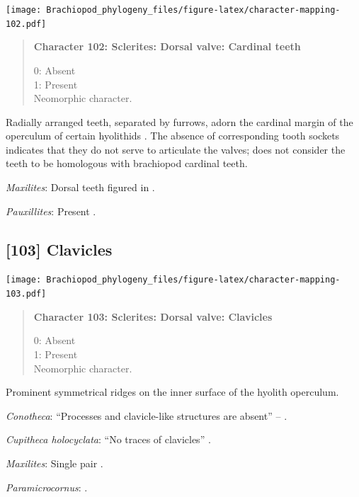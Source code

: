 \documentclass[openany]{book}
\begin{document}
\texttt{[image: Brachiopod\_phylogeny\_files/figure-latex/character-mapping-102.pdf]}

\begin{quote}
\textbf{Character 102: Sclerites: Dorsal valve: Cardinal teeth}

0: Absent\\
1: Present\\
Neomorphic character.
\end{quote}

Radially arranged teeth, separated by furrows, adorn the cardinal margin
of the operculum of certain hyolithids \citep{Marek1963}. The absence of
corresponding tooth sockets indicates that they do not serve to
articulate the valves; \citet{Marek1967} does not consider the teeth to
be homologous with brachiopod cardinal teeth.

\hypertarget{Maxilites-coding-102}{}
\emph{Maxilites}: Dorsal teeth figured in \citet{MartiMus2005}.

\hypertarget{Pauxillites-coding-102}{}
\emph{Pauxillites}: Present \citep{Marek1966}.

\subsection*{{[}103{]} Clavicles}\label{clavicles}

\texttt{[image: Brachiopod\_phylogeny\_files/figure-latex/character-mapping-103.pdf]}

\begin{quote}
\textbf{Character 103: Sclerites: Dorsal valve: Clavicles}

0: Absent\\
1: Present\\
Neomorphic character.
\end{quote}

Prominent symmetrical ridges on the inner surface of the hyolith
operculum.

\hypertarget{Conotheca-coding-103}{}
\emph{Conotheca}: ``Processes and clavicle-like structures are absent''
-- \citet{Devaere2014}.

\hypertarget{Cupitheca_holocyclata-coding-103}{}
\emph{Cupitheca holocyclata}: ``No traces of clavicles''
\citep{Skovsted2016}.

\hypertarget{Maxilites-coding-103}{}
\emph{Maxilites}: Single pair \citep{Marek1972}.

\hypertarget{Paramicrocornus-coding-103}{}
\emph{Paramicrocornus}: \citet{Zhang2018Ahyolithid}.
\end{document}
